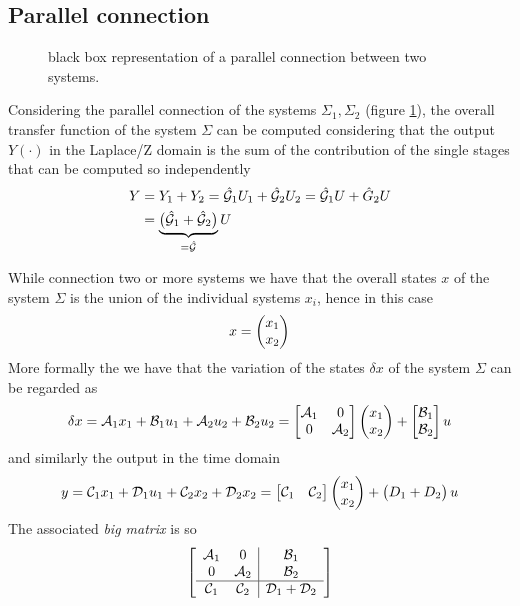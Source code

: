 	\subsection{Parallel connection}
		\begin{figure}[b!]
			\centering
			\caption{black box representation of a parallel connection between two systems.} \label{fig:dyn:parallel}
		\end{figure}
		Considering the parallel connection of the systems $\Sigma_1,\Sigma_2$ (figure \ref{fig:dyn:parallel}), the overall transfer function of the system $\Sigma$ can be computed considering that the output $Y(\cdot)$ in the Laplace/Z domain is the sum of the contribution of the single stages that can be computed so independently
		\begin{equation}
		\begin{aligned}
			Y &  = Y_1 + Y_2 = \hat {\mathcal{G}}_1 U_1 + \hat {\mathcal{G}}_2 U_2 = \hat {\mathcal{G}}_1 U + \hat G_2 U \\
			& = \underbrace{\big(\hat {\mathcal{G}}_1  + \hat {\mathcal{G}}_2\big)}_{=\hat {\mathcal{G}}} U
		\end{aligned}
		\end{equation}
		
		While connection two or more systems we have that the overall states $x$ of the system $\Sigma$ is the union of the individual systems $x_i$, hence in this case
		\[ x = \begin{pmatrix} x_1 \\ x_2 \end{pmatrix} \]
		More formally the we have that the variation of the states $\delta x$ of the system $\Sigma$ can be regarded as
		\[ \delta x = \mathcal{A}_1 x_1 + \mathcal{B}_1 u_1 + \mathcal{A}_2 u_2 + \mathcal{B}_2 u_2 = \begin{bmatrix} \mathcal{A}_1 & 0 \\ 0 & \mathcal{A}_2 \end{bmatrix} \begin{pmatrix} x_1 \\ x_2 \end{pmatrix} + \begin{bmatrix} \mathcal{B}_1 \\ \mathcal{B}_2 \end{bmatrix} u \]
		and similarly the output in the time domain
		\[ y = \mathcal{C}_1 x_1 + \mathcal{D}_1 u_1 + \mathcal{C}_2 x_2 + \mathcal{D}_2 x_2 = \begin{bmatrix} \mathcal{C}_1 & \mathcal{C}_2 \end{bmatrix} \begin{pmatrix} x_1 \\ x_2 \end{pmatrix} + \begin{pmatrix} D_1+D_2 \end{pmatrix} u \]
		The associated \textit{big matrix} is so
		\begin{equation} \begin{bmatrix} \begin{array}{c c | c}
					\mathcal{A}_1 & 0 & \mathcal{B}_1 \\ 0 & \mathcal{A}_2 & \mathcal{B}_2 \\ \hline \mathcal{C}_1 & \mathcal{C}_2 & \mathcal{D}_1 + \mathcal{D}_2
			\end{array} \end{bmatrix}
		\end{equation}
	
